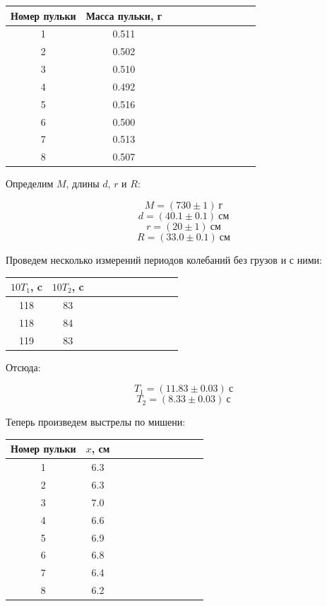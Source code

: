 \documentclass[14pt]{article}
\begin{document}
\begin{center}
\begin{tabular}{|c|c|c|c|c|c|c|c|c|c|c|}
\hline
Номер пульки	&	Масса пульки, г			\\
\hline
1				&	0.511					\\
\hline
2				&	0.502					\\
\hline
3				&	0.510					\\
\hline
4				&	0.492					\\
\hline
5				&	0.516					\\
\hline
6				&	0.500					\\
\hline
7				&	0.513					\\
\hline
8				&	0.507					\\
\hline
\end{tabular}
\end{center}

\vspace{0.5cm}
Определим $M$, длины $d$, $r$ и $R$:

$$
	M = (730 \pm 1) ~\text{г}
$$
$$
	d = (40.1 \pm 0.1) ~\text{см}
$$
$$
	r = (20 \pm 1) ~\text{см}
$$
$$
	R = (33.0 \pm 0.1) ~\text{см}
$$

Проведем несколько измерений периодов колебаний без грузов и с ними:

\begin{center}
\begin{tabular}{|c|c|c|c|c|c|c|c|c|c|c|}
\hline
$10T_1$, c	&	$10T_2$, c	\\
\hline
118			&	83			\\
\hline
118			&	84			\\
\hline
119			&	83			\\
\hline
\end{tabular}
\end{center}

Отсюда:

$$
	T_1 = (11.83 \pm 0.03)~\text{с}
$$
$$
	T_2 = (8.33 \pm 0.03)~\text{с}
$$

\vspace{0.5cm}

Теперь произведем выстрелы по мишени:
\begin{center}
\begin{tabular}{|c|c|c|c|c|c|c|c|c|c|c|}
\hline
Номер пульки	&	$x$, см			\\
\hline
1				&	6.3				\\
\hline
2				&	6.3				\\
\hline
3				&	7.0				\\
\hline
4				&	6.6				\\
\hline
5				&	6.9				\\
\hline
6				&	6.8				\\
\hline
7				&	6.4				\\
\hline
8				&	6.2				\\
\hline
\end{tabular}
\end{center}
\end{document}
